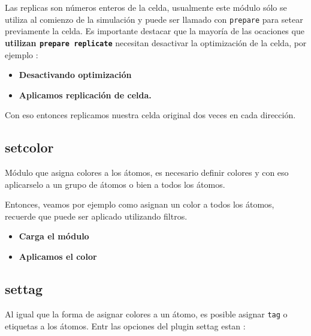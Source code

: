Las replicas son n\'umeros enteros de la celda, usualmente este m\'odulo s\'olo se utiliza al comienzo de la simulaci\'on y puede ser llamado con \verb|prepare| para setear previamente la celda. Es importante destacar que la mayor\'ia de las ocaciones que \textbf{utilizan \texttt{prepare replicate}} necesitan desactivar la optimizaci\'on de la celda, por ejemplo :

\begin{itemize}
 \item \textbf{Desactivando optimizaci\'on}
 \item \textbf{Aplicamos replicaci\'on de celda.}
\end{itemize}

Con eso entonces replicamos nuestra celda original dos veces en cada direcci\'on.

\subsection{setcolor}
M\'odulo que asigna colores a los \'atomos, es necesario definir colores y con eso aplicarselo a un grupo de \'atomos o bien a todos los \'atomos. 


Entonces, veamos por ejemplo como asignan un color a todos los \'atomos, recuerde que puede ser aplicado utilizando filtros.

\begin{itemize}
 \item \textbf{Carga el m\'odulo}
 \item \textbf{Aplicamos el color}
\end{itemize}

\subsection{settag}
Al igual que la forma de asignar colores a un \'atomo, es posible asignar \verb|tag| o etiquetas a los \'atomos. Entr las opciones del plugin settag estan :



